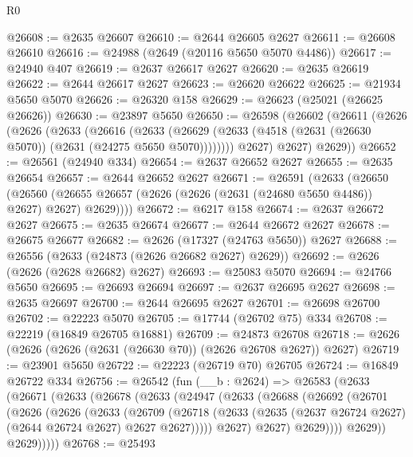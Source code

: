 \begin{lexlean}{R0}
\begin{coremodule}
@26608 := @2635 @26607
@26610 := @2644 @26605 @2627
@26611 := @26608 @26610
@26616 := @24988 (@2649 (@20116 @5650 @5070 @4486))
@26617 := @24940 @407
@26619 := @2637 @26617 @2627
@26620 := @2635 @26619
@26622 := @2644 @26617 @2627
@26623 := @26620 @26622
@26625 := @21934 @5650 @5070
@26626 := @26320 @158
@26629 := @26623 (@25021 (@26625 @26626))
@26630 := @23897 @5650
@26650 := @26598
    (@26602
      (@26611
        (@2626
          (@2626
            (@2633
              (@26616
                (@2633
                  (@26629 (@2633 (@4518 (@2631 (@26630 @5070)) (@2631 (@24275 @5650 @5070))))))))
            @2627)
          @2627)
        @2629))
@26652 := @26561 (@24940 @334)
@26654 := @2637 @26652 @2627
@26655 := @2635 @26654
@26657 := @2644 @26652 @2627
@26671 := @26591
    (@2633
      (@26650
        (@26560 (@26655 @26657 (@2626 (@2626 (@2631 (@24680 @5650 @4486)) @2627) @2627) @2629))))
@26672 := @6217 @158
@26674 := @2637 @26672 @2627
@26675 := @2635 @26674
@26677 := @2644 @26672 @2627
@26678 := @26675 @26677
@26682 := @2626 (@17327 (@24763 @5650)) @2627
@26688 := @26556 (@2633 (@24873 (@2626 @26682 @2627) @2629))
@26692 := @2626 (@2626 (@2628 @26682) @2627)
@26693 := @25083 @5070
@26694 := @24766 @5650
@26695 := @26693 @26694
@26697 := @2637 @26695 @2627
@26698 := @2635 @26697
@26700 := @2644 @26695 @2627
@26701 := @26698 @26700
@26702 := @22223 @5070
@26705 := @17744 (@26702 @75) @334
@26708 := @22219 (@16849 @26705 @16881)
@26709 := @24873 @26708
@26718 := @2626 (@2626 (@2626 (@2631 (@26630 @70)) (@2626 @26708 @2627)) @2627)
@26719 := @23901 @5650
@26722 := @22223 (@26719 @70) @26705
@26724 := @16849 @26722 @334
@26756 := @26542
    (fun (__b : @2624) =>
    @26583
      (@2633
        (@26671
          (@2633
            (@26678
              (@2633
                (@24947
                  (@2633
                    (@26688
                      (@26692
                        (@26701
                          (@2626
                            (@2626
                              (@2633
                                (@26709
                                  (@26718
                                    (@2633
                                      (@2635
                                        (@2637 @26724 @2627)
                                        (@2644 @26724 @2627)
                                        @2627
                                        @2627)))))
                              @2627)
                            @2627)
                          @2629))))
                  @2629))
              @2629)))))
@26768 := @25493

\end{coremodule}
\end{lexlean}
